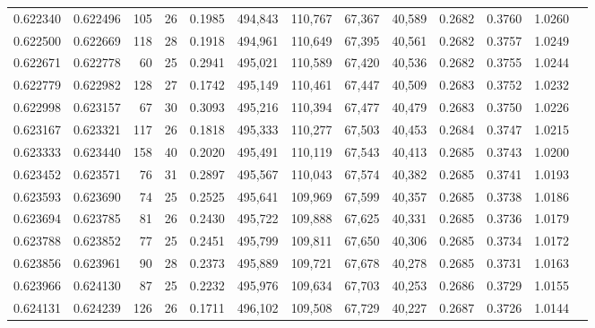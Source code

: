 \begin{tabular}{rrrrrrrrrrrrr}
0.622340 & 0.622496 &    105 &    26 &                                     0.1985 & 494,843 & 110,767 &  67,367 &  40,589 & 0.2682 & 0.3760 & 1.0260 \\
0.622500 & 0.622669 &    118 &    28 &                                     0.1918 & 494,961 & 110,649 &  67,395 &  40,561 & 0.2682 & 0.3757 & 1.0249 \\
0.622671 & 0.622778 &     60 &    25 &                                     0.2941 & 495,021 & 110,589 &  67,420 &  40,536 & 0.2682 & 0.3755 & 1.0244 \\
0.622779 & 0.622982 &    128 &    27 &                                     0.1742 & 495,149 & 110,461 &  67,447 &  40,509 & 0.2683 & 0.3752 & 1.0232 \\
0.622998 & 0.623157 &     67 &    30 &                                     0.3093 & 495,216 & 110,394 &  67,477 &  40,479 & 0.2683 & 0.3750 & 1.0226 \\
0.623167 & 0.623321 &    117 &    26 &                                     0.1818 & 495,333 & 110,277 &  67,503 &  40,453 & 0.2684 & 0.3747 & 1.0215 \\
0.623333 & 0.623440 &    158 &    40 &                                     0.2020 & 495,491 & 110,119 &  67,543 &  40,413 & 0.2685 & 0.3743 & 1.0200 \\
0.623452 & 0.623571 &     76 &    31 &                                     0.2897 & 495,567 & 110,043 &  67,574 &  40,382 & 0.2685 & 0.3741 & 1.0193 \\
0.623593 & 0.623690 &     74 &    25 &                                     0.2525 & 495,641 & 109,969 &  67,599 &  40,357 & 0.2685 & 0.3738 & 1.0186 \\
0.623694 & 0.623785 &     81 &    26 &                                     0.2430 & 495,722 & 109,888 &  67,625 &  40,331 & 0.2685 & 0.3736 & 1.0179 \\
0.623788 & 0.623852 &     77 &    25 &                                     0.2451 & 495,799 & 109,811 &  67,650 &  40,306 & 0.2685 & 0.3734 & 1.0172 \\
0.623856 & 0.623961 &     90 &    28 &                                     0.2373 & 495,889 & 109,721 &  67,678 &  40,278 & 0.2685 & 0.3731 & 1.0163 \\
0.623966 & 0.624130 &     87 &    25 &                                     0.2232 & 495,976 & 109,634 &  67,703 &  40,253 & 0.2686 & 0.3729 & 1.0155 \\
0.624131 & 0.624239 &    126 &    26 &                                     0.1711 & 496,102 & 109,508 &  67,729 &  40,227 & 0.2687 & 0.3726 & 1.0144 \\

\end{tabular}

